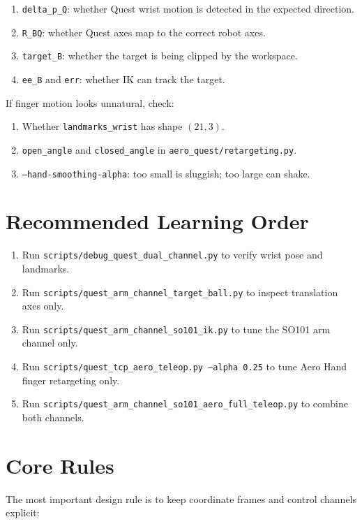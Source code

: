\documentclass[11pt]{article}
\begin{document}
\begin{enumerate}
  \item \texttt{delta\_p\_Q}: whether Quest wrist motion is detected in the expected direction.
  \item \texttt{R\_BQ}: whether Quest axes map to the correct robot axes.
  \item \texttt{target\_B}: whether the target is being clipped by the workspace.
  \item \texttt{ee\_B} and \texttt{err}: whether IK can track the target.
\end{enumerate}

If finger motion looks unnatural, check:

\begin{enumerate}
  \item Whether \texttt{landmarks\_wrist} has shape \((21,3)\).
  \item \texttt{open\_angle} and \texttt{closed\_angle} in \texttt{aero\_quest/retargeting.py}.
  \item \texttt{--hand-smoothing-alpha}: too small is sluggish; too large can shake.
\end{enumerate}

\section{Recommended Learning Order}

\begin{enumerate}
  \item Run \texttt{scripts/debug\_quest\_dual\_channel.py} to verify wrist pose and landmarks.
  \item Run \texttt{scripts/quest\_arm\_channel\_target\_ball.py} to inspect translation axes only.
  \item Run \texttt{scripts/quest\_arm\_channel\_so101\_ik.py} to tune the SO101 arm channel only.
  \item Run \texttt{scripts/quest\_tcp\_aero\_teleop.py --alpha 0.25} to tune Aero Hand finger retargeting only.
  \item Run \texttt{scripts/quest\_arm\_channel\_so101\_aero\_full\_teleop.py} to combine both channels.
\end{enumerate}

\section{Core Rules}

The most important design rule is to keep coordinate frames and control
channels explicit:
\end{document}
